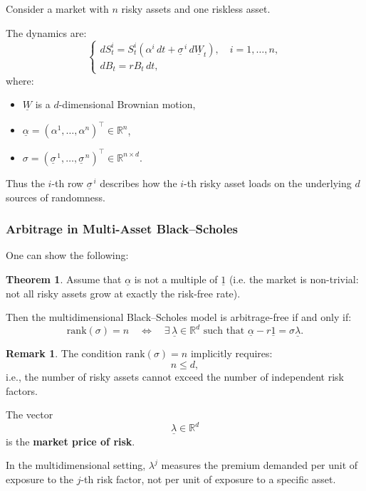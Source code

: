 \documentclass[12pt,a4paper]{article}
\theoremstyle{definition}
\newtheorem{theorem}{Theorem}[section]
\newtheorem{remark}{Remark}[section]
\newcommand{\R}{\mathbb{R}}
\begin{document}
Consider a market with $n$ risky assets and one riskless asset.

The dynamics are:
\[
\begin{cases}
dS_t^i = S_t^i(\alpha^i \, dt + \underline{\sigma}^{\,i} \, d\underline{W}_t), \quad i = 1, \ldots, n, \\
dB_t = r B_t \, dt,
\end{cases}
\]
where:
\begin{itemize}
\item $\underline{W}$ is a $d$-dimensional Brownian motion,
\item $\underline{\alpha} = (\alpha^1, \ldots, \alpha^n)^\top \in \R^n$,
\item $\sigma = (\underline{\sigma}^{\,1}, \ldots, \underline{\sigma}^{\,n})^\top \in \R^{n \times d}$.
\end{itemize}

Thus the $i$-th row $\underline{\sigma}^{\,i}$ describes how the $i$-th risky asset loads on the underlying $d$ sources of randomness.

\subsubsection{Arbitrage in Multi-Asset Black--Scholes}

One can show the following:

\begin{theorem}
Assume that $\underline{\alpha}$ is not a multiple of $\underline{1}$ (i.e. the market is non-trivial: not all risky assets grow at exactly the risk-free rate).

Then the multidimensional Black--Scholes model is arbitrage-free if and only if:
\[
\text{rank}(\sigma) = n \quad \iff \quad \exists \, \underline{\lambda} \in \R^d \text{ such that } \underline{\alpha} - r\underline{1} = \sigma \underline{\lambda}.
\]
\end{theorem}

\begin{remark}
The condition $\text{rank}(\sigma) = n$ implicitly requires:
\[
n \leq d,
\]
i.e., the number of risky assets cannot exceed the number of independent risk factors.

The vector
\[
\underline{\lambda} \in \R^d
\]
is the \textbf{market price of risk}.

In the multidimensional setting, $\lambda^j$ measures the premium demanded per unit of exposure to the $j$-th risk factor, not per unit of exposure to a specific asset.
\end{remark}
\end{document}
